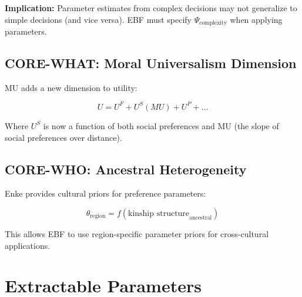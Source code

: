 \textbf{Implication:} Parameter estimates from complex decisions may not
generalize to simple decisions (and vice versa). EBF must specify
$\Psi_{\text{complexity}}$ when applying parameters.

\subsection{CORE-WHAT: Moral Universalism Dimension}

MU adds a new dimension to utility:

\begin{equation}
U = U^F + U^S(MU) + U^P + ...
\end{equation}

Where $U^S$ is now a function of both social preferences and MU (the slope
of social preferences over distance).

\subsection{CORE-WHO: Ancestral Heterogeneity}

Enke provides cultural priors for preference parameters:

\begin{equation}
\theta_{\text{region}} = f(\text{kinship structure}_{\text{ancestral}})
\end{equation}

This allows EBF to use region-specific parameter priors for cross-cultural
applications.


\section{Extractable Parameters}
\label{sec:enk-parameters}

